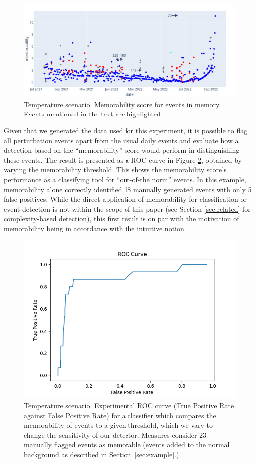 \documentclass[entropy,article,submit,moreauthors,pdftex]{Definitions/mdpi}
\begin{document}
\begin{figure}[!ht]
    \centering
    \includegraphics[width=.9\linewidth]{figures/memo_scenar_2.png}
    \caption{Temperature scenario. Memorability score for events in memory. Events mentioned in the text are highlighted.}
    \label{fig:result1}
\end{figure}

Given that we generated the data used for this experiment, it is possible to
flag all perturbation events apart from the usual daily events and evaluate how a
detection based on the ``memorability'' score would perform in distinguishing these
events. The result is presented as a ROC curve in Figure \ref{fig:roc}, obtained by varying the memorability threshold. This shows the memorability score's performance as a classifying tool for ``out-of-the norm'' events. In this example, memorability alone correctly identified 18 manually generated events with only 5 false-positives. While the direct application of memorability for classification or event detection is not within the scope of this paper (see Section \ref{sec:related} for complexity-based detection), this first result is on par with the motivation of memorability being in accordance with the intuitive notion.

\begin{figure}[!ht]
    \centering
    \includegraphics[width=0.7\linewidth]{./figures/roc}
    \caption{Temperature scenario. Experimental ROC curve (True Positive Rate against False Positive
        Rate) for a classifier which compares the memorability of events to a given threshold, which we vary to change the sensitivity of our detector. Measures consider 23
        manually flagged events as memorable (events added to the normal background
        as described in Section~\ref{sec:example}.)}
    \label{fig:roc}
\end{figure}
\end{document}
